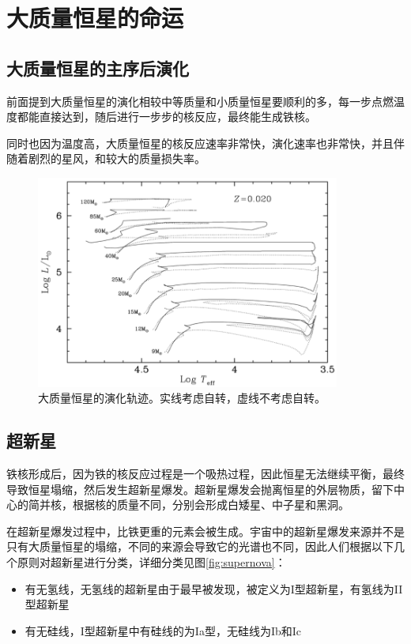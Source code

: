 \documentclass[openany]{ctexbook}
\begin{document}
\chapter{大质量恒星的命运}
\section{大质量恒星的主序后演化}
前面提到大质量恒星的演化相较中等质量和小质量恒星要顺利的多，每一步点燃温度都能直接达到，随后进行一步步的核反应，最终能生成铁核。

同时也因为温度高，大质量恒星的核反应速率非常快，演化速率也非常快，并且伴随着剧烈的星风，和较大的质量损失率。

\begin{figure}[hbt]
  \centering
  \includegraphics[width=10cm]{chapters/15/massive}
  \caption{大质量恒星的演化轨迹。实线考虑自转，虚线不考虑自转。}
  \label{}
\end{figure}

\section{超新星}
铁核形成后，因为铁的核反应过程是一个吸热过程，因此恒星无法继续平衡，最终导致恒星塌缩，然后发生超新星爆发。超新星爆发会抛离恒星的外层物质，留下中心的简并核，根据核的质量不同，分别会形成白矮星、中子星和黑洞。

在超新星爆发过程中，比铁更重的元素会被生成。宇宙中的超新星爆发来源并不是只有大质量恒星的塌缩，不同的来源会导致它的光谱也不同，因此人们根据以下几个原则对超新星进行分类，详细分类见图\ref{fig:supernova}：
\begin{itemize}
  \item 有无氢线，无氢线的超新星由于最早被发现，被定义为I型超新星，有氢线为II型超新星
  \item 有无硅线，I型超新星中有硅线的为Ia型，无硅线为Ib和Ic
\end{itemize}
\end{document}
